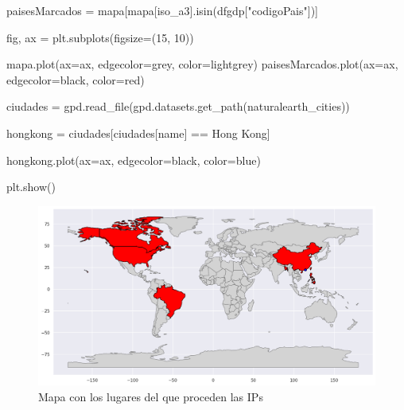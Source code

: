 \documentclass[
  letterpaper,
  DIV=11,
  numbers=noendperiod]{scrartcl}
\newenvironment{Shaded}{\begin{snugshade}}{\end{snugshade}}
\newcommand{\DecValTok}[1]{\textcolor[rgb]{0.68,0.00,0.00}{#1}}
\newcommand{\NormalTok}[1]{\textcolor[rgb]{0.00,0.23,0.31}{#1}}
\newcommand{\OperatorTok}[1]{\textcolor[rgb]{0.37,0.37,0.37}{#1}}
\newcommand{\StringTok}[1]{\textcolor[rgb]{0.13,0.47,0.30}{#1}}
\begin{document}
\begin{Shaded}
\begin{Highlighting}[]
\NormalTok{paisesMarcados }\OperatorTok{=}\NormalTok{ mapa[mapa[}\StringTok{\textquotesingle{}iso\_a3\textquotesingle{}}\NormalTok{].isin(dfgdp[}\StringTok{"codigoPais"}\NormalTok{])]}

\NormalTok{fig, ax }\OperatorTok{=}\NormalTok{ plt.subplots(figsize}\OperatorTok{=}\NormalTok{(}\DecValTok{15}\NormalTok{, }\DecValTok{10}\NormalTok{))}

\NormalTok{mapa.plot(ax}\OperatorTok{=}\NormalTok{ax, edgecolor}\OperatorTok{=}\StringTok{\textquotesingle{}grey\textquotesingle{}}\NormalTok{, color}\OperatorTok{=}\StringTok{\textquotesingle{}lightgrey\textquotesingle{}}\NormalTok{)}
\NormalTok{paisesMarcados.plot(ax}\OperatorTok{=}\NormalTok{ax, edgecolor}\OperatorTok{=}\StringTok{\textquotesingle{}black\textquotesingle{}}\NormalTok{, color}\OperatorTok{=}\StringTok{\textquotesingle{}red\textquotesingle{}}\NormalTok{)}

\NormalTok{ciudades }\OperatorTok{=}\NormalTok{ gpd.read\_file(gpd.datasets.get\_path(}\StringTok{\textquotesingle{}naturalearth\_cities\textquotesingle{}}\NormalTok{))}

\NormalTok{hongkong }\OperatorTok{=}\NormalTok{ ciudades[ciudades[}\StringTok{\textquotesingle{}name\textquotesingle{}}\NormalTok{] }\OperatorTok{==} \StringTok{\textquotesingle{}Hong Kong\textquotesingle{}}\NormalTok{]}

\NormalTok{hongkong.plot(ax}\OperatorTok{=}\NormalTok{ax, edgecolor}\OperatorTok{=}\StringTok{\textquotesingle{}black\textquotesingle{}}\NormalTok{, color}\OperatorTok{=}\StringTok{\textquotesingle{}blue\textquotesingle{}}\NormalTok{)}

\NormalTok{plt.show()}
\end{Highlighting}
\end{Shaded}

\begin{figure}[H]

{\centering \includegraphics{Análisis_files/figure-pdf/fig-mapaddos-output-1.png}

}

\caption{\label{fig-mapaddos}Mapa con los lugares del que proceden las
IPs}

\end{figure}
\end{document}
